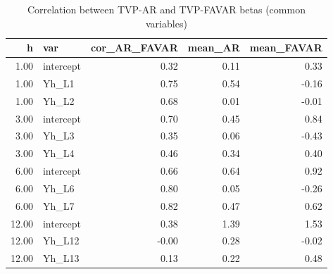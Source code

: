 \begin{table}[ht]
\centering
\begin{tabular}{rlrrr}
  \hline
h & var & cor\_AR\_FAVAR & mean\_AR & mean\_FAVAR \\ 
  \hline
1.00 & intercept & 0.32 & 0.11 & 0.33 \\ 
  1.00 & Yh\_L1 & 0.75 & 0.54 & -0.16 \\ 
  1.00 & Yh\_L2 & 0.68 & 0.01 & -0.01 \\ 
  3.00 & intercept & 0.70 & 0.45 & 0.84 \\ 
  3.00 & Yh\_L3 & 0.35 & 0.06 & -0.43 \\ 
  3.00 & Yh\_L4 & 0.46 & 0.34 & 0.40 \\ 
  6.00 & intercept & 0.66 & 0.64 & 0.92 \\ 
  6.00 & Yh\_L6 & 0.80 & 0.05 & -0.26 \\ 
  6.00 & Yh\_L7 & 0.82 & 0.47 & 0.62 \\ 
  12.00 & intercept & 0.38 & 1.39 & 1.53 \\ 
  12.00 & Yh\_L12 & -0.00 & 0.28 & -0.02 \\ 
  12.00 & Yh\_L13 & 0.13 & 0.22 & 0.48 \\ 
   \hline
\end{tabular}
\caption{Correlation between TVP-AR and TVP-FAVAR betas (common variables)} 
\label{tab:cross_ar_favar}
\end{table}
